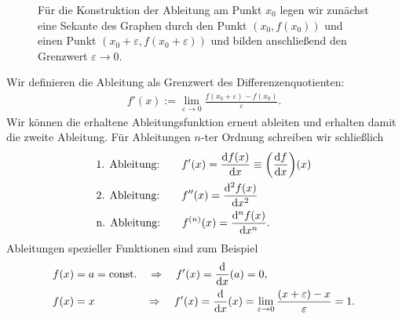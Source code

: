 \begin{figure}[htp]
    \centering
    \caption{Für die Konstruktion der Ableitung am Punkt $x_0$ legen wir zunächst eine Sekante des Graphen durch den Punkt $(x_0, f(x_0))$ und einen Punkt $(x_0 + \varepsilon, f(x_0+\varepsilon))$ und bilden anschließend den Grenzwert $\varepsilon \to 0$.} 
    \label{}
\end{figure}

Wir definieren die Ableitung als Grenzwert des Differenzenquotienten: 
\begin{align}
    f'(x) := \lim_{\varepsilon \to 0} \frac{f(x_0 + \varepsilon)-f(x_0)}{\varepsilon}.
\end{align}
Wir können die erhaltene Ableitungsfunktion erneut ableiten und erhalten damit die zweite Ableitung. Für Ableitungen $n$-ter Ordnung schreiben wir schließlich 
\begin{align}
    &\text{1. Ableitung:} \qquad f'(x) = \dv{f(x)}{x} \equiv \qty(\dv{f}{x})(x) \notag \\
    &\text{2. Ableitung:} \qquad f''(x) = \dv[2]{f(x)}{x} \notag \\
    &\text{n. Ableitung:} \qquad f^{(n)}(x) = \dv[n]{f(x)}{x}.
\end{align}
Ableitungen spezieller Funktionen sind zum Beispiel 
\begin{align}
    \begin{split}
        f(x) &= a =\text{const.} \quad \Rightarrow \quad f'(x) = \dv{x}(a) = 0, \\
        f(x) &= x \hphantom{= const.} \quad \Rightarrow \quad f'(x) = \dv{x}(x) = \lim_{\varepsilon \to 0} \frac{(x+\varepsilon) - x }{\varepsilon} = 1.
    \end{split}
\end{align}

